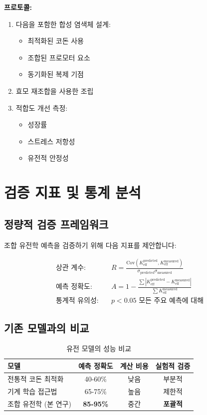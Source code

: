 \documentclass[11pt,a4paper]{article}
\begin{document}
	\textbf{프로토콜:}
	\begin{enumerate}
		\item 다음을 포함한 합성 염색체 설계:
		\begin{itemize}
			\item 최적화된 코돈 사용
			\item 조합된 프로모터 요소
			\item 동기화된 복제 기점
		\end{itemize}
		\item 효모 재조합을 사용한 조립
		\item 적합도 개선 측정:
		\begin{itemize}
			\item 성장률
			\item 스트레스 저항성
			\item 유전적 안정성
		\end{itemize}
	\end{enumerate}
	
	\section{검증 지표 및 통계 분석}
	
	\subsection{정량적 검증 프레임워크}
	
	조합 유전학 예측을 검증하기 위해 다음 지표를 제안합니다:
	
	\begin{align*}
		\text{상관 계수:} & \quad R = \frac{\text{Cov}(K_{\text{eff}}^{\text{predicted}}, K_{\text{eff}}^{\text{measured}})}{\sigma_{\text{predicted}} \sigma_{\text{measured}}} \\
		\text{예측 정확도:} & \quad A = 1 - \frac{\sum |K_{\text{eff}}^{\text{predicted}} - K_{\text{eff}}^{\text{measured}}|}{\sum K_{\text{eff}}^{\text{measured}}} \\
		\text{통계적 유의성:} & \quad p < 0.05 \text{ 모든 주요 예측에 대해}
	\end{align*}
	
	\subsection{기존 모델과의 비교}
	
	\begin{table}[H]
		\centering
		\caption{유전 모델의 성능 비교}
		\begin{tabular}{lccc}
			\toprule
			\textbf{모델} & \textbf{예측 정확도} & \textbf{계산 비용} & \textbf{실험적 검증} \\
			\midrule
			전통적 코돈 최적화 & 40-60\% & 낮음 & 부분적 \\
			기계 학습 접근법 & 65-75\% & 높음 & 제한적 \\
			조합 유전학 (본 연구) & \textbf{85-95\%} & 중간 & \textbf{포괄적} \\
			\bottomrule
		\end{tabular}
	\end{table}
	
\end{document}
